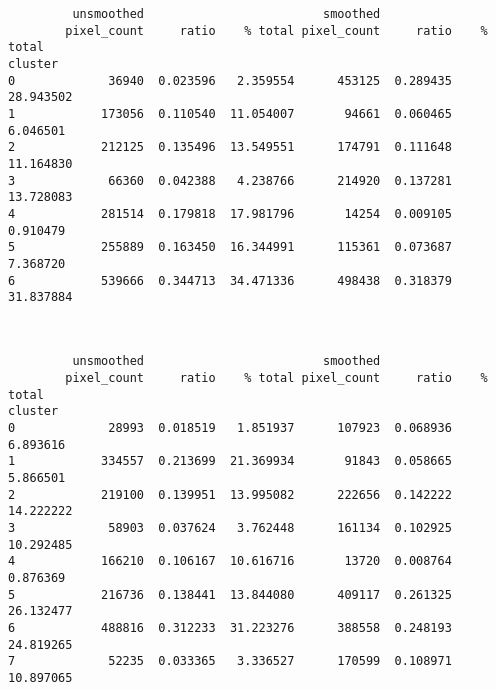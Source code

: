\documentclass[11pt]{article}
\begin{document}
    
    \begin{verbatim}
         unsmoothed                         smoothed                     
        pixel_count     ratio    % total pixel_count     ratio    % total
cluster                                                                  
0             36940  0.023596   2.359554      453125  0.289435  28.943502
1            173056  0.110540  11.054007       94661  0.060465   6.046501
2            212125  0.135496  13.549551      174791  0.111648  11.164830
3             66360  0.042388   4.238766      214920  0.137281  13.728083
4            281514  0.179818  17.981796       14254  0.009105   0.910479
5            255889  0.163450  16.344991      115361  0.073687   7.368720
6            539666  0.344713  34.471336      498438  0.318379  31.837884
    \end{verbatim}

    
    \begin{center}
    \end{center}
    { \hspace*{\fill} \\}
    
    
    \begin{verbatim}
         unsmoothed                         smoothed                     
        pixel_count     ratio    % total pixel_count     ratio    % total
cluster                                                                  
0             28993  0.018519   1.851937      107923  0.068936   6.893616
1            334557  0.213699  21.369934       91843  0.058665   5.866501
2            219100  0.139951  13.995082      222656  0.142222  14.222222
3             58903  0.037624   3.762448      161134  0.102925  10.292485
4            166210  0.106167  10.616716       13720  0.008764   0.876369
5            216736  0.138441  13.844080      409117  0.261325  26.132477
6            488816  0.312233  31.223276      388558  0.248193  24.819265
7             52235  0.033365   3.336527      170599  0.108971  10.897065
    \end{verbatim}

    
    \begin{center}
    \end{center}
    { \hspace*{\fill} \\}
    
\end{document}

